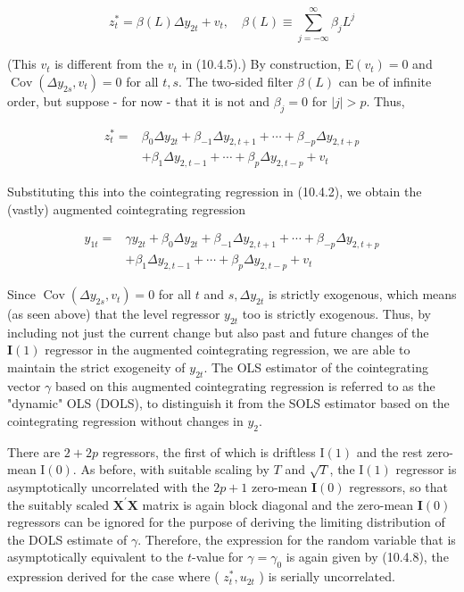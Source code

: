 \documentclass[10pt]{article}
\begin{document}
\begin{equation*}
z_{t}^{*}=\beta(L) \Delta y_{2 t}+v_{t}, \quad \beta(L) \equiv \sum_{j=-\infty}^{\infty} \beta_{j} L^{j} \tag{10.4.9}
\end{equation*}


(This $v_{t}$ is different from the $v_{t}$ in (10.4.5).) By construction, $\mathrm{E}\left(v_{t}\right)=0$ and $\operatorname{Cov}\left(\Delta y_{2 s}, v_{t}\right)=0$ for all $t, s$. The two-sided filter $\beta(L)$ can be of infinite order, but suppose - for now - that it is not and $\beta_{j}=0$ for $|j|>p$. Thus,


\begin{align*}
z_{t}^{*}= & \beta_{0} \Delta y_{2 t}+\beta_{-1} \Delta y_{2, t+1}+\cdots+\beta_{-p} \Delta y_{2, t+p} \\
& +\beta_{1} \Delta y_{2, t-1}+\cdots+\beta_{p} \Delta y_{2, t-p}+v_{t} \tag{10.4.10}
\end{align*}


Substituting this into the cointegrating regression in (10.4.2), we obtain the (vastly) augmented cointegrating regression


\begin{align*}
y_{1 t}= & \gamma y_{2 t}+\beta_{0} \Delta y_{2 t}+\beta_{-1} \Delta y_{2, t+1}+\cdots+\beta_{-p} \Delta y_{2, t+p} \\
& +\beta_{1} \Delta y_{2, t-1}+\cdots+\beta_{p} \Delta y_{2, t-p}+v_{t} \tag{10.4.11}
\end{align*}


Since $\operatorname{Cov}\left(\Delta y_{2 s}, v_{t}\right)=0$ for all $t$ and $s, \Delta y_{2 t}$ is strictly exogenous, which means (as seen above) that the level regressor $y_{2 t}$ too is strictly exogenous. Thus, by including not just the current change but also past and future changes of the $\mathbf{I}(1)$ regressor in the augmented cointegrating regression, we are able to maintain the strict exogeneity of $y_{2 t}$. The OLS estimator of the cointegrating vector $\gamma$ based on this augmented cointegrating regression is referred to as the "dynamic" OLS (DOLS), to distinguish it from the SOLS estimator based on the cointegrating regression without changes in $y_{2}$.

There are $2+2 p$ regressors, the first of which is driftless $\mathrm{I}(1)$ and the rest zero-mean $\mathrm{I}(0)$. As before, with suitable scaling by $T$ and $\sqrt{T}$, the $\mathrm{I}(1)$ regressor is asymptotically uncorrelated with the $2 p+1$ zero-mean $\mathbf{I}(0)$ regressors, so that the suitably scaled $\mathbf{X}^{\prime} \mathbf{X}$ matrix is again block diagonal and the zero-mean $\mathbf{I}(0)$ regressors can be ignored for the purpose of deriving the limiting distribution of the DOLS estimate of $\gamma$. Therefore, the expression for the random variable that is asymptotically equivalent to the $t$-value for $\gamma=\gamma_{0}$ is again given by (10.4.8), the expression derived for the case where ( $z_{t}^{*}, u_{2 t}$ ) is serially uncorrelated.
\end{document}
